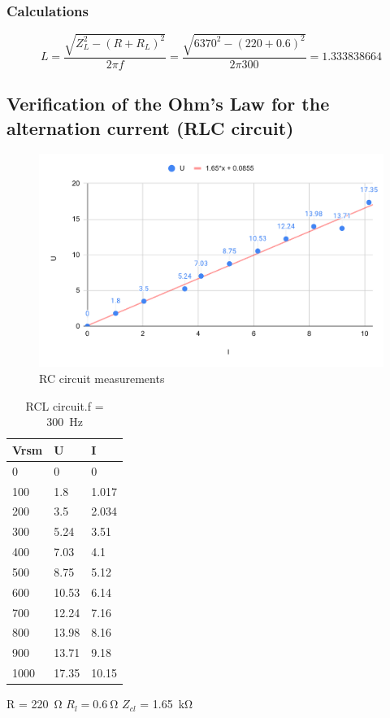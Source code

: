 \subsubsection*{Calculations}

\begin{equation}
	L = \frac{\sqrt{Z_L^2-(R+R_L)^2}}{2\pi f} = 
	\frac{\sqrt{6370^2-(220+0.6)^2}}{2\pi 300} =
	1.333838664
\end{equation}



\subsection{Verification of the Ohm's Law for the alternation current (RLC circuit)}

\begin{figure}[H]
	\centering
	\includegraphics[width= 14cm]{schematics/verification.pdf}
	\caption{RC circuit measurements }
	\label{fig:verification}
\end{figure}

\begin{table}[!ht]
    \centering
    \begin{tabular}{l|l|l}
        Vrsm & U & I \\ \hline
        0 & 0 & 0 \\ 
        100 & 1.8 & 1.017 \\ 
        200 & 3.5 & 2.034 \\ 
        300 & 5.24 & 3.51 \\ 
        400 & 7.03 & 4.1 \\ 
        500 & 8.75 & 5.12 \\ 
        600 & 10.53 & 6.14 \\ 
        700 & 12.24 & 7.16 \\ 
        800 & 13.98 & 8.16 \\ 
        900 & 13.71 & 9.18 \\ 
        1000 & 17.35 & 10.15 \\ 
    \end{tabular}
    \caption{RCL circuit.f = \SI{300}{\hertz}} R = \SI{220}{\ohm} $R_l = \SI{0.6}{\ohm}$ $Z_{cl}$ = \SI{1.65}{\kilo\ohm}
    \label{tab:verification}
    \end{table}
    
